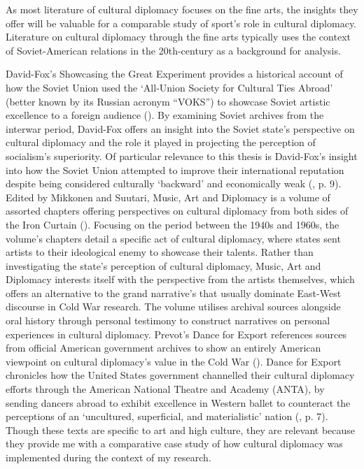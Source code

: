 As most literature of cultural diplomacy focuses on the fine arts, the insights they offer will be valuable for a comparable study of sport’s role in cultural diplomacy. Literature on cultural diplomacy through the fine arts typically uses the context of Soviet-American relations in the 20th-century as a background for analysis. 

David-Fox’s Showcasing the Great Experiment provides a historical account of how the Soviet Union used the ‘All-Union Society for Cultural Ties Abroad’ (better known by its Russian acronym “VOKS”) to showcase Soviet artistic excellence to a foreign audience (\cite{david-fox2012}). By examining Soviet archives from the interwar period, David-Fox offers an insight into the Soviet state’s perspective on cultural diplomacy and the role it played in projecting the perception of socialism’s superiority. Of particular relevance to this thesis is David-Fox’s insight into how the Soviet Union attempted to improve their international reputation despite being considered culturally ‘backward’ and economically weak (\cite{david-fox2012}, p. 9). Edited by Mikkonen and Suutari, Music, Art and Diplomacy is a volume of assorted chapters offering perspectives on cultural diplomacy from both sides of the Iron Curtain (\cite{mikkonensuutari2016}). Focusing on the period between the 1940s and 1960s, the volume’s chapters detail a specific act of cultural diplomacy, where states sent artists to their ideological enemy to showcase their talents. Rather than investigating the state’s perception of cultural diplomacy, Music, Art and Diplomacy interests itself with the perspective from the artists themselves, which offers an alternative to the grand narrative’s that usually dominate East-West discourse in Cold War research. The volume utilises archival sources alongside oral history through personal testimony to construct narratives on personal experiences in cultural diplomacy.  Prevot’s Dance for Export references sources from official American government archives to show an entirely American viewpoint on cultural diplomacy’s value in the Cold War (\cite{prevots2012}). Dance for Export chronicles how the United States government channelled their cultural diplomacy efforts through the American National Theatre and Academy (ANTA), by sending dancers abroad to exhibit excellence in Western ballet to counteract the perceptions of an ‘uncultured, superficial, and materialistic’ nation (\cite{prevots2012}, p. 7). Though these texts are specific to art and high culture, they are relevant because they provide me with a comparative case study of how cultural diplomacy was implemented during the context of my research. 

